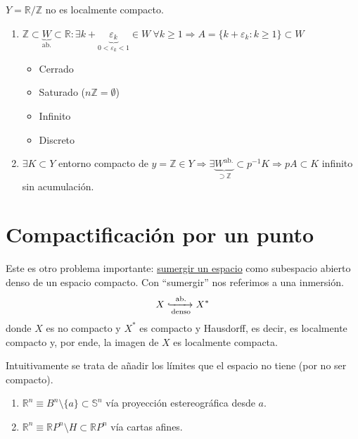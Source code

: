\begin{ej}
$Y = \mathbb{R} / \mathbb{Z}$ no es localmente compacto.
\begin{enumerate}
    \item $\mathbb{Z} \subset \underbrace{W}_{\text{ab.}} \subset \mathbb{R}: \exists k + \underbrace{\varepsilon_k}_{0 < \varepsilon_k < 1} \in W\ \forall k \ge 1 \Rightarrow A = \{k + \varepsilon_k : k \ge 1\} \subset W$
    \begin{itemize}
        \item Cerrado
        \item Saturado ($n\mathbb{Z} = \emptyset$)
        \item Infinito
        \item Discreto
    \end{itemize}

    \item $\exists K \subset Y$ entorno compacto de $y = \mathbb{Z} \in Y \Rightarrow \exists \underbrace{W^{\text{ab.}}}_{\supset \mathbb{Z}} \subset p^{-1} K \Rightarrow pA \subset K$ infinito sin acumulación.
\end{enumerate}
\end{ej}

\section{Compactificación por un punto}%
\label{sec:compactificacion_por_un_punto}
Este es otro problema importante: \underline{sumergir un espacio} como subespacio abierto denso de un espacio compacto. Con ``sumergir'' nos referimos a una inmersión.
\[
    X \xhookrightarrow[\text{denso}]{\text{ab.}} X^*
\]
donde $X$ es no compacto y $X^*$ es compacto y Hausdorff, es decir, es localmente compacto y, por ende, la imagen de $X$ es localmente compacta.

Intuitivamente se trata de añadir los límites que el espacio no tiene (por no ser compacto).

\begin{ej}
\begin{enumerate}
    \item $\mathbb{R}^n \equiv B^n \setminus \{a\} \subset \mathbb{S}^n$ vía proyección estereográfica desde $a$.
    \item $\mathbb{R}^n \equiv \mathbb{R}P^n \setminus H \subset \mathbb{R}P^n$ vía cartas afines.
\end{enumerate}
\end{ej}

